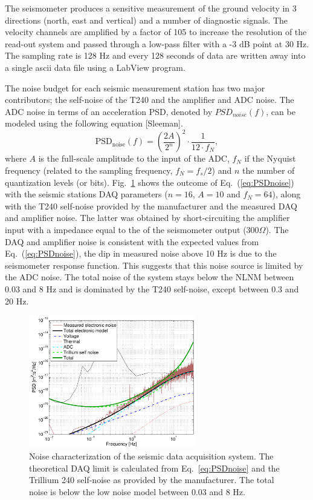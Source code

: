 The seismometer produces a sensitive measurement of the ground velocity in 3 directions (north, east and vertical) and a number of diagnostic signals. The velocity channels are amplified by a factor of 105 to increase the resolution of the read-out system and passed through a low-pass filter with a -3 dB point at 30 Hz. The sampling rate is 128 Hz and every 128 seconds of data are written away into a single ascii data file using a LabView program. 

The noise budget for each seismic measurement station has two major contributors; the self-noise of the T240 and the amplifier and ADC noise. The ADC noise in terms of an acceleration PSD, denoted by $PSD_{noise}(f)$, can be modeled using the following equation [Sleeman].
\begin{equation}
\mbox{PSD}_{\mbox{noise}}(f) = \left(\frac{2A}{2^n}\right)^2 \cdot \frac{1}{12 \cdot f_{N}},
\label{eq:PSDnoise}
\end{equation}
where $A$ is the full-scale amplitude to the input of the ADC, $f_N$ if the Nyquist frequency (related to the sampling frequency, $f_N = f_s/2$) and $n$ the number of quantization levels (or bits). Fig.~\ref{Fig:Seis_noise} shows the outcome of Eq.~(\ref{eq:PSDnoise}) with the seismic stations DAQ parameters ($n=16$, $A=10$ and $f_{N}=64$), along with the T240 self-noise provided by the manufacturer and the measured DAQ and amplifier noise. The latter was obtained by short-circuiting the amplifier input with a impedance equal to the of the seismometer output ($300\Omega$). The DAQ and amplifier noise is consistent with the expected values from Eq.~(\ref{eq:PSDnoise}), the dip in measured noise above 10 Hz is due to the seismometer response function. This suggests that this noise source is limited by the ADC noise. The total noise of the system stays below the NLNM between 0.03 and 8 Hz and is dominated by the T240 self-noise, except between 0.3 and 20 Hz.
\begin{figure}[h]
	\begin{center}
		\includegraphics[width=0.65\textwidth]{./Sec_SiteInfra/Figures/compare_noise}\hspace{1pc}%
		\caption{Noise characterization of the seismic data acquisition system. The theoretical DAQ limit is calculated from Eq.~\ref{eq:PSDnoise} and the Trillium 240 self-noise as provided by the manufacturer. The total noise is below the low noise model between 0.03 and 8 Hz.}
		\label{Fig:Seis_noise}
	\end{center}
\end{figure}

